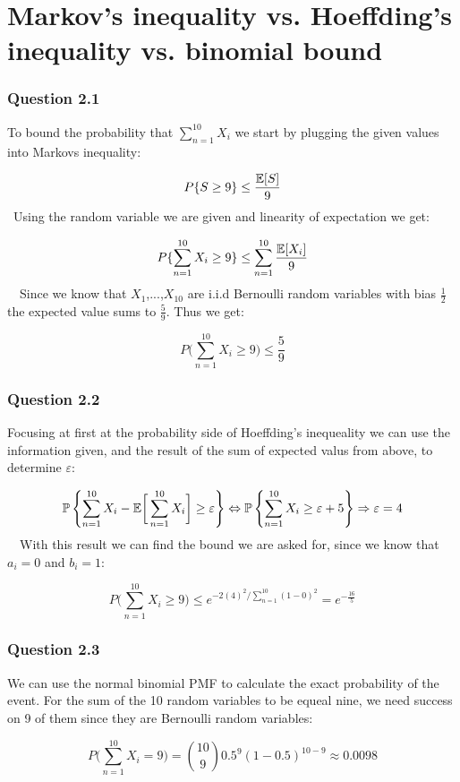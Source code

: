 \documentclass{article}
\begin{document}
\newpage
\section{Markov’s inequality vs. Hoeffding’s inequality vs. binomial bound}
\subsubsection*{Question 2.1}
To bound the probability that \(\sum_{n=1}^{10} X_i\) we start by plugging
the given values into Markovs inequality:

\[
P\{S \ge 9\} \le \dfrac{{\mathbb{E}}[S]}{9}
\]
\
Using the random variable we are given and linearity of expectation we get:

\[
P\{\displaystyle\sum_{n=1}^{10} X_i \ge 9\} \le \displaystyle\sum_{n=1}^{10}
\dfrac{{\mathbb{E}}[X_i]}{9}
\]
\
\
Since we know that \(X_1\),...,\(X_{10}\) are i.i.d Bernoulli random variables
with bias \(\frac{1}{2}\) the expected value sums to \(\frac{5}{9}\). Thus we get:

\[
P\Big(\sum_{n=1}^{10} X_i \ge 9 \Big) \le \dfrac{5}{9}
\]

\subsubsection*{Question 2.2}
Focusing at first at the probability side of Hoeffding's inequeality we can use
the information given, and the result of the sum of expected valus from above,
to determine \(\varepsilon\):

\[
\mathbb{P}\left\{\displaystyle\sum_{n=1}^{10} X_i -
{\mathbb{E}}\bigg[\displaystyle\sum_{n=1}^{10} X_i \bigg] \ge \varepsilon \right\} \Leftrightarrow
\mathbb{P}\left\{\displaystyle\sum_{n=1}^{10} X_i \ge \varepsilon + 5 \right\} \Rightarrow
\varepsilon = 4
\]
\
\
With this result we can find the bound we are asked for, since we know that
\(a_i=0\) and \(b_i=1\):

\[
P\Big(\sum_{n=1}^{10} X_i \ge 9 \Big) \le e^{-2(4)^2/\sum_{n=1}^{10}(1-0)^2} = e^{-\frac{16}{5}}
\]

\subsubsection*{Question 2.3}
We can use the normal binomial PMF to calculate the exact probability of the
event. For the sum of the 10 random variables to be equeal nine,
we need success on  9 of them since they are Bernoulli random
variables:

\[
P\Big(\sum_{n=1}^{10} X_i = 9 \Big) = {{10}\choose{9}} 0.5^9(1-0.5)^{10-9} \approx 0.0098
\]
\end{document}
